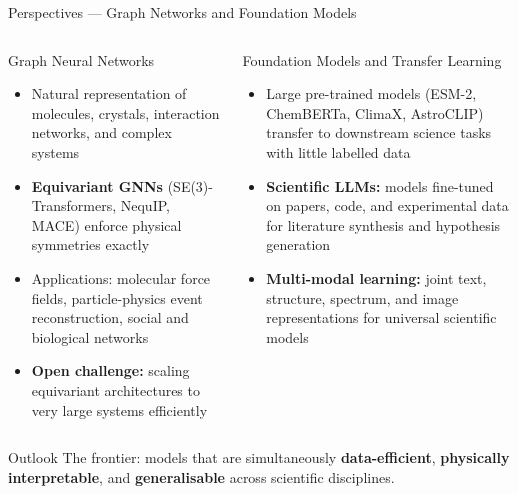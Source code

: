 \documentclass[aspectratio=169,11pt]{beamer}
\begin{document}
\begin{frame}{Perspectives --- Graph Networks and Foundation Models}
  \begin{columns}[T]
      \begin{block}{Graph Neural Networks}
        \begin{itemize}\itemsep2pt
          \item Natural representation of molecules,
                crystals, interaction networks,
                and complex systems
          \item \textbf{Equivariant GNNs}
                (SE(3)-Transformers, NequIP, MACE)
                enforce physical symmetries exactly
          \item Applications: molecular force fields,
                particle-physics event reconstruction,
                social and biological networks
          \item \textbf{Open challenge:}
                scaling equivariant architectures
                to very large systems efficiently
        \end{itemize}
      \end{block}
      \begin{block}{Foundation Models and Transfer Learning}
        \begin{itemize}\itemsep2pt
          \item Large pre-trained models (ESM-2,
                ChemBERTa, ClimaX, AstroCLIP)
                transfer to downstream science tasks
                with little labelled data
          \item \textbf{Scientific LLMs:}
                models fine-tuned on papers, code,
                and experimental data for literature
                synthesis and hypothesis generation
          \item \textbf{Multi-modal learning:}
                joint text, structure, spectrum, and
                image representations for universal
                scientific models
        \end{itemize}
      \end{block}
  \end{columns}
  \vspace{3pt}
  \begin{exampleblock}{Outlook}
    The frontier: models that are simultaneously
    \textbf{data-efficient}, \textbf{physically interpretable},
    and \textbf{generalisable} across scientific disciplines.
  \end{exampleblock}
\end{frame}
\end{document}
